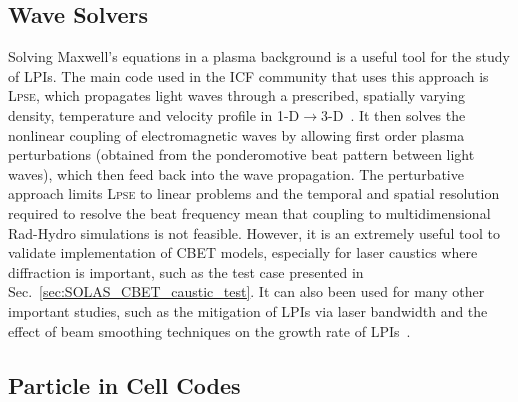 \subsection{Wave Solvers}

Solving Maxwell's equations in a plasma background is a useful tool for the study of \ac{LPIs}.
The main code used in the \ac{ICF} community that uses this approach is \textsc{Lpse}, which propagates light waves through a prescribed, spatially varying density, temperature and velocity profile in 1-D$\rightarrow$3-D~\cite{myatt_wave-based_2017,myatt_lpse_2019}.
It then solves the nonlinear coupling of electromagnetic waves by allowing first order plasma perturbations (obtained from the ponderomotive beat pattern between light waves), which then feed back into the wave propagation.
The perturbative approach limits \textsc{Lpse} to linear problems and the temporal and spatial resolution required to resolve the beat frequency mean that coupling to multidimensional \ac{Rad-Hydro} simulations is not feasible.
However, it is an extremely useful tool to validate implementation of \ac{CBET} models, especially for laser caustics where diffraction is important, such as the test case presented in Sec.~\ref{sec:SOLAS_CBET_caustic_test}.
It can also been used for many other important studies, such as the mitigation of \ac{LPIs} via laser bandwidth and the effect of beam smoothing techniques on the growth rate of \ac{LPIs}~\cite{follett_thresholds_2021}.

\subsection{Particle in Cell Codes}

